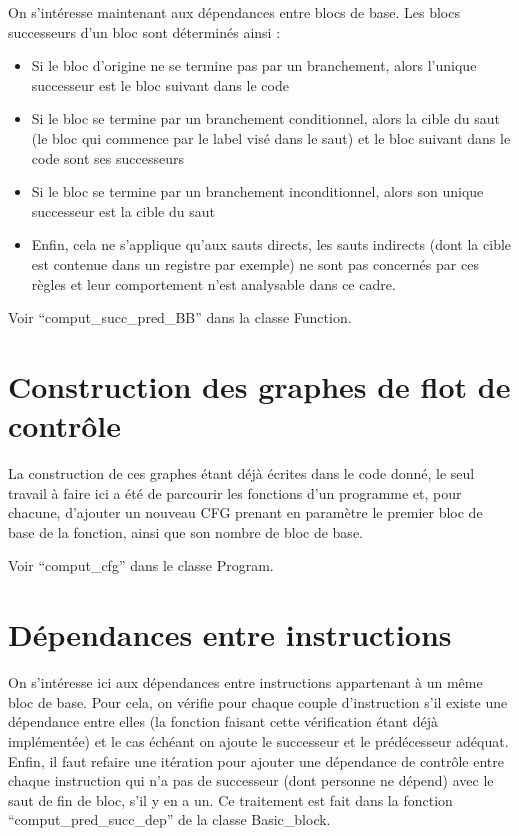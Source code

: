\documentclass[a4paper, 11pt]{article}
\begin{document}
On s'intéresse maintenant aux dépendances entre blocs de base. Les blocs successeurs d'un bloc sont déterminés ainsi :
\begin{itemize}
\item Si le bloc d'origine ne se termine pas par un branchement, alors l'unique successeur est le bloc suivant dans le code
\item Si le bloc se termine par un branchement conditionnel, alors la cible du saut (le bloc qui commence par le label visé dans le saut) et le bloc suivant dans le code sont ses successeurs
\item Si le bloc se termine par un branchement inconditionnel, alors son unique successeur est la cible du saut
\item Enfin, cela ne s'applique qu'aux sauts directs, les sauts indirects (dont la cible est contenue dans un registre par exemple) ne sont pas concernés par ces règles et leur comportement n'est analysable dans ce cadre.
\end{itemize}

Voir ``comput\_succ\_pred\_BB'' dans la classe Function.

\section{Construction des graphes de flot de contrôle}

La construction de ces graphes étant déjà écrites dans le code donné, le seul travail à faire ici a été de parcourir les fonctions d'un programme et, pour chacune, d'ajouter un nouveau CFG prenant en paramètre le premier bloc de base de la fonction, ainsi que son nombre de bloc de base.

Voir ``comput\_cfg'' dans le classe Program.

\section{Dépendances entre instructions}

On s'intéresse ici aux dépendances entre instructions appartenant à un même bloc de base. Pour cela, on vérifie pour chaque couple d'instruction s'il existe une dépendance entre elles (la fonction faisant cette vérification étant déjà implémentée) et le cas échéant on ajoute le successeur et le prédécesseur adéquat. Enfin, il faut refaire une itération pour ajouter une dépendance de contrôle entre chaque instruction qui n'a pas de successeur (dont personne ne dépend) avec le saut de fin de bloc, s'il y en a un. Ce traitement est fait dans la fonction ``comput\_pred\_succ\_dep'' de la classe Basic\_block. 
\end{document}
